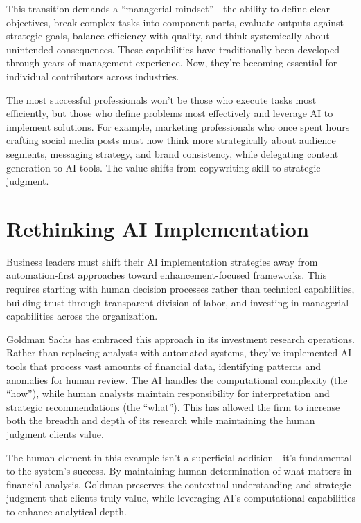 \documentclass[
  Letterpaper,
]{scrbook}
\begin{document}
This transition demands a ``managerial mindset''---the ability to define
clear objectives, break complex tasks into component parts, evaluate
outputs against strategic goals, balance efficiency with quality, and
think systemically about unintended consequences. These capabilities
have traditionally been developed through years of management
experience. Now, they're becoming essential for individual contributors
across industries.

The most successful professionals won't be those who execute tasks most
efficiently, but those who define problems most effectively and leverage
AI to implement solutions. For example, marketing professionals who once
spent hours crafting social media posts must now think more
strategically about audience segments, messaging strategy, and brand
consistency, while delegating content generation to AI tools. The value
shifts from copywriting skill to strategic judgment.

\section{Rethinking AI
Implementation}\label{rethinking-ai-implementation}

Business leaders must shift their AI implementation strategies away from
automation-first approaches toward enhancement-focused frameworks. This
requires starting with human decision processes rather than technical
capabilities, building trust through transparent division of labor, and
investing in managerial capabilities across the organization.

Goldman Sachs has embraced this approach in its investment research
operations. Rather than replacing analysts with automated systems,
they've implemented AI tools that process vast amounts of financial
data, identifying patterns and anomalies for human review. The AI
handles the computational complexity (the ``how''), while human analysts
maintain responsibility for interpretation and strategic recommendations
(the ``what''). This has allowed the firm to increase both the breadth
and depth of its research while maintaining the human judgment clients
value.

The human element in this example isn't a superficial addition---it's
fundamental to the system's success. By maintaining human determination
of what matters in financial analysis, Goldman preserves the contextual
understanding and strategic judgment that clients truly value, while
leveraging AI's computational capabilities to enhance analytical depth.
\end{document}
